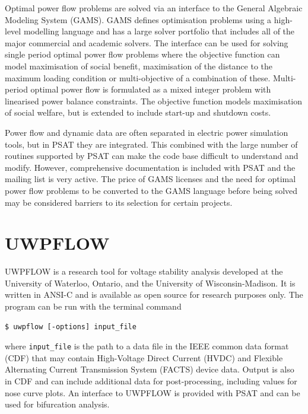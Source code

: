 Optimal power flow problems are solved via an interface to the General Algebraic
Modeling System (GAMS).  GAMS defines optimisation problems using a high-level
modelling language and has a large solver portfolio that includes all of the
major commercial and academic solvers.  The interface can be used for solving single
period optimal power flow problems where the objective function can model
maximisation of social benefit, maximisation of the distance to the maximum
loading condition or multi-objective of a combination of these. Multi-period
optimal power flow is formulated as a mixed integer problem with linearised
power balance constraints.  The objective function models maximisation of social
welfare, but is extended to include start-up and shutdown costs.

Power flow and dynamic data are often separated in electric power
simulation tools, but in PSAT they are integrated.  This combined with the
large number of routines supported by PSAT can make the code base difficult to
understand and modify.  However, comprehensive documentation is included with
PSAT and the mailing list is very active.
The price of GAMS
licenses and the need for optimal power flow problems to be converted to the
GAMS language before being solved may be considered barriers to its
selection for certain projects.

\section{UWPFLOW}
UWPFLOW is a research tool for voltage stability analysis developed at the
University of Waterloo, Ontario, and the University of Wisconsin-Madison.  It
is written in ANSI-C and is available as open source for research purposes
only. The program can be run with the terminal command
\begin{center}
\begin{verbatim}
$ uwpflow [-options] input_file
\end{verbatim}
\end{center}
where \texttt{input\_file} is the path to a data file in the IEEE common data
format (CDF) \cite{cdf:73} that may contain High-Voltage Direct Current (HVDC)
and Flexible Alternating Current Transmission System (FACTS) device data.
Output is also in CDF and can include additional data for post-processing,
including values for nose curve plots.  An interface to UWPFLOW is provided
with PSAT and can be used for bifurcation analysis.

